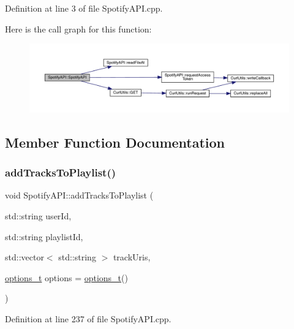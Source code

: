 Definition at line 3 of file Spotify\+A\+P\+I.\+cpp.

Here is the call graph for this function\+:
\nopagebreak
\begin{figure}[H]
\begin{center}
\leavevmode
\includegraphics[width=350pt]{class_spotify_a_p_i_ab0d1896e2ab4c52f496eb494640a89b1_cgraph}
\end{center}
\end{figure}


\subsection{Member Function Documentation}
\mbox{\label{class_spotify_a_p_i_a045a3f9378e1fe18372e38ad58f86c91}} 
\subsubsection{\texorpdfstring{add\+Tracks\+To\+Playlist()}{addTracksToPlaylist()}}
{\footnotesize\ttfamily void Spotify\+A\+P\+I\+::add\+Tracks\+To\+Playlist (\begin{DoxyParamCaption}\item[{std\+::string}]{user\+Id,  }\item[{std\+::string}]{playlist\+Id,  }\item[{std\+::vector$<$ std\+::string $>$}]{track\+Uris,  }\item[{\mbox{\hyperlink{_spotify_a_p_i_8h_a0ff5cac1a4007bb330b7d9939650c283}{options\+\_\+t}}}]{options = {\ttfamily \mbox{\hyperlink{_spotify_a_p_i_8h_a0ff5cac1a4007bb330b7d9939650c283}{options\+\_\+t}}()} }\end{DoxyParamCaption})}



Definition at line 237 of file Spotify\+A\+P\+I.\+cpp.

